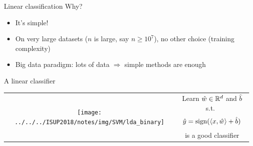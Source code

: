 \documentclass[xcolor={usenames,dvipsnames}]{beamer}
\begin{document}
\begin{frame}{Linear classification}
  Why?
  \begin{itemize}
    \item It's simple!
    \item On very large datasets ($n$ is large, say $n \geq 10^7$), no other choice (training complexity)
    \item Big data paradigm: lots of data $\Rightarrow$ simple methods are enough
  \end{itemize}


  \medskip


  
  \begin{block}{A linear classifier}
  
  \begin{tabular}[htbp]{cc}    
    \begin{minipage}[htbp]{.5\linewidth}
      \vspace{0.2cm}
      \begin{center}
  				\texttt{[image: ../../../ISUP2018/notes/img/SVM/lda\_binary]}
      \end{center}
    \end{minipage}
    &
    \begin{minipage}[htbp]{.5\linewidth}
      Learn $\hat w \in \mathbb{R}^d$ and $\hat b$ s.t.\       
      \begin{equation*}
        \hat y = \operatorname{sign}(\langle {x, \hat w} \rangle + \hat b)
      \end{equation*}
      is a good classifier
    \end{minipage}
	\end{tabular}
  \end{block}
\end{frame}
\end{document}
